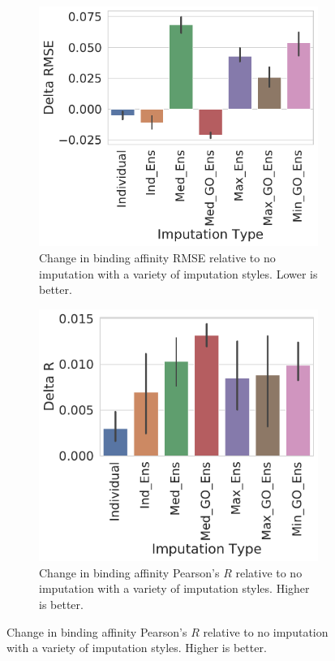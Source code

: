 \documentclass[journal=jmcmar,manuscript=article]{achemso}
\begin{document}
\begin{figure}[tbph]
    \centering
    \begin{subfigure}[t]{0.48\textwidth}
        \centering
        \includegraphics[width=\linewidth]{figures/ComparingImpStylesRMSE.pdf}
        \caption{Change in binding affinity RMSE relative to no imputation with a variety of imputation styles. Lower is better.}
    \end{subfigure}
    \hfill
    \begin{subfigure}[t]{0.48\textwidth}
        \centering
        \includegraphics[width=\linewidth]{figures/ComparingImpStylesR.pdf}
        \caption{Change in binding affinity Pearson's $R$ relative to no imputation with a variety of imputation styles. Higher is better.}
    \end{subfigure}


\end{figure}
\end{document}
